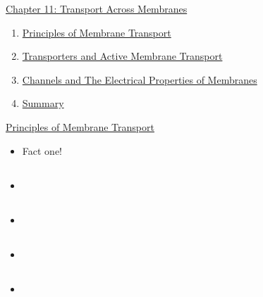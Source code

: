 \documentclass[12pt,letterpaper]{article}
\begin{document}
\begin{chapbox}{\hyperlink{home}{Chapter 11: Transport Across Membranes}}
    \begin{enumerate}
        \item \hyperlink{11.1}{Principles of Membrane Transport}
        \item \hyperlink{11.2}{Transporters and Active Membrane Transport}
        \item \hyperlink{11.3}{Channels and The Electrical Properties of Membranes}
        \item \hyperlink{11.r}{Summary}
    \end{enumerate}
\end{chapbox}

\hypertarget{11.1}{}
\begin{secbox}{\hyperlink{11}{Principles of Membrane Transport}}{
    \begin{itemize}
        \item Fact one!
    \end{itemize}
    \hypertarget{11.1.1}{\subsection*{}}
    \begin{itemize}
        \item
    \end{itemize}

    \hypertarget{11.1.2}{\subsection*{}}
    \begin{itemize}
        \item
    \end{itemize}

    \hypertarget{11.1.3}{\subsection*{}}
    \begin{itemize}
        \item
    \end{itemize}

    \hypertarget{11.1.4}{\subsection*{}}
    \begin{itemize}
    \item
    \end{itemize}

}\end{secbox}
\end{document}
